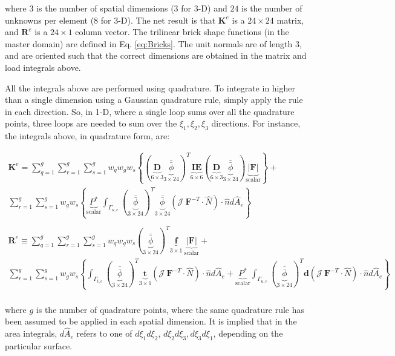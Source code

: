 \documentclass[10pt]{article}
\begin{document}
where \(3\) is the number of spatial dimensions (3 for 3-D) and \(24\) is the number of unknowns per element (8 for 3-D). The net result is that \(\textbf{K}^e\) is a \(24\times24\) matrix, and \(\textbf{R}^e\) is a \(24\times1\) column vector. The trilinear brick shape functions (in the master domain) are defined in Eq. \eqref{eq:Bricks}. The unit normals are of length 3, and are oriented such that the correct dimensions are obtained in the matrix and load integrals above.

All the integrals above are performed using quadrature. To integrate in higher than a single dimension using a Gaussian quadrature rule, simply apply the rule in each direction. So, in 1-D, where a single loop sums over all the quadrature points, three loops are needed to sum over the \(\xi_1,\xi_2,\xi_3\) directions. For instance, the integrals above, in quadrature form, are:

\begin{equation}
\label{eq:FEWeakForm_element3}
\begin{aligned}
\textbf{K}^e=\sum_{q=1}^g\sum_{r=1}^g\sum_{s=1}^gw_qw_gw_s\left\{(\underbrace{\textbf{D}}_{6\times3}\underbrace{\bar{\bar{\phi}}}_{3\times24})^T\underbrace{\textbf{IE}}_{6\times6}(\underbrace{\textbf{D}}_{6\times3}\underbrace{\bar{\bar{\phi}}}_{3\times24})\underbrace{|\textbf{F}|}_\text{scalar}\right\} +\quad\\
\sum_{r=1}^g\sum_{s=1}^gw_gw_s\left\{\underbrace{P^{*}}_\text{scalar}\int_{\Gamma_{u,e}}(\underbrace{\bar{\bar{\phi}}}_{3\times24})^T\underbrace{\bar{\bar{\phi}}}_{3\times24}(\mathscr{J}\ \textbf{F}^{-T}\cdot\hat{N})\cdot\hat{n}d\hat{A}_e\right\}\\
\ \\
\textbf{R}^e\equiv\sum_{q=1}^g\sum_{r=1}^g\sum_{s=1}^gw_qw_gw_s(\underbrace{\bar{\bar{\phi}}}_{3\times24})^T\underbrace{\textbf{f}}_{3\times1}\ \underbrace{|\textbf{F}|}_\text{scalar}+\quad\\
\sum_{r=1}^g\sum_{s=1}^gw_gw_s\left\{\int_{\Gamma_{t,e}}(\underbrace{\bar{\bar{\phi}}}_{3\times24})^T\underbrace{\textbf{t}}_{3\times1}(\mathscr{J}\ \textbf{F}^{-T}\cdot\hat{N})\cdot\hat{n}d\hat{A}_e+\underbrace{P^{*}}_\text{scalar}\int_{\Gamma_{u,e}}(\underbrace{\bar{\bar{\phi}}}_{3\times24})^T\textbf{d}(\mathscr{J}\ \textbf{F}^{-T}\cdot\hat{N})\cdot\hat{n}d\hat{A}_e\right\}\\
\end{aligned}
\end{equation}

where \(g\) is the number of quadrature points, where the same quadrature rule has been assumed to be applied in each spatial dimension. It is implied that in the area integrals, \(d\hat{A}_e\) refers to one of \(d\xi_1d\xi_2\), \(d\xi_2d\xi_3, d\xi_3d\xi_1\), depending on the particular surface.
\end{document}
